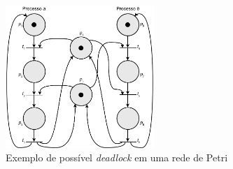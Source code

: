 \begin{figure}[ht]
	\caption{\label{fig:petrinet_deadlock}Exemplo de possível \textit{deadlock} em uma rede de Petri}
	\begin{center}
	    \includegraphics[width=0.5\textwidth]{resources/petri_net_peterson_deadlock}
	\end{center}
\end{figure}



